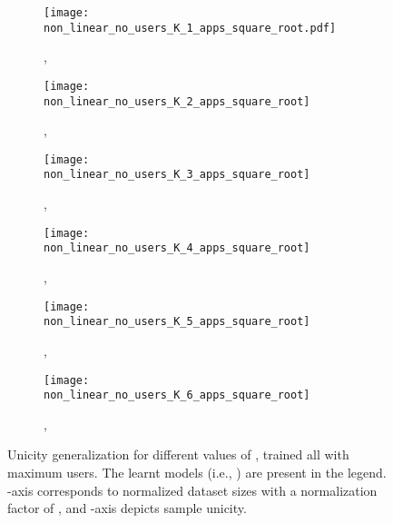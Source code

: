 \documentclass{acm_proc_article-sp}
\theoremstyle{plain}
\theoremstyle{plain}
\theoremstyle{plain}
\theoremstyle{plain}
\theoremstyle{plain}
\theoremstyle{plain}
\begin{document}
\begin{figure*}[!t]
        \centering
        \begin{subfigure}[]{0.3\textwidth}
                \texttt{[image: non\_linear\_no\_users\_K\_1\_apps\_square\_root.pdf]}
                \caption{, }
                \label{fig:K_1}
        \end{subfigure}
\begin{subfigure}[]{0.3\textwidth}
                \texttt{[image: non\_linear\_no\_users\_K\_2\_apps\_square\_root]}
                \caption{, }
                \label{fig:K_2}
        \end{subfigure}
\begin{subfigure}[]{0.3\textwidth}
                \texttt{[image: non\_linear\_no\_users\_K\_3\_apps\_square\_root]}
                \caption{, }
                \label{fig:K_3}
        \end{subfigure}
        \begin{subfigure}[]{0.3\textwidth}
                \texttt{[image: non\_linear\_no\_users\_K\_4\_apps\_square\_root]}
                \caption{, }
                \label{fig:K_4}
        \end{subfigure}
        \begin{subfigure}[]{0.3\textwidth}
                \texttt{[image: non\_linear\_no\_users\_K\_5\_apps\_square\_root]}
                \caption{, }
                \label{fig:K_5}
        \end{subfigure}
    \begin{subfigure}[]{0.3\textwidth}
                \texttt{[image: non\_linear\_no\_users\_K\_6\_apps\_square\_root]}
                \caption{, }
                \label{fig:K_6}
        \end{subfigure}
\caption{Unicity generalization for different values of , trained all with maximum  users. The learnt models (i.e., ) are present in the legend. -axis corresponds to normalized dataset sizes with a normalization factor of , and -axis depicts sample unicity.}
    \label{fig:unicity_generalization}
\end{figure*}
\end{document}
